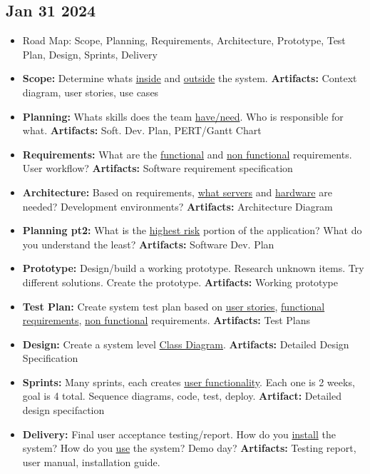 \documentclass[12pt]{article}
\begin{document}
\subsection*{Jan 31 2024}

\begin{itemize}
		  \item Road Map: Scope, Planning, Requirements, Architecture, Prototype, Test Plan, Design, Sprints, Delivery
		  \item \textbf{Scope:} Determine whats \underline{inside} and \underline{outside} the system. 
					 \textbf{Artifacts:} Context diagram, user stories, use cases
		  \item \textbf{Planning:} Whats skills does the team \underline{have/need}. Who is responsible for what. 
					 \textbf{Artifacts:} Soft. Dev. Plan, PERT/Gantt Chart
		  \item \textbf{Requirements:} What are the \underline{functional} and \underline{non functional} 
					 requirements. User workflow? \textbf{Artifacts:} Software requirement specification
		  \item \textbf{Architecture:} Based on requirements, \underline{what servers} and \underline{hardware} are needed? 
					 Development environments? \textbf{Artifacts:} Architecture Diagram
		  \item \textbf{Planning pt2:} What is the \underline{highest risk} portion of the application? What do you understand
					 the least? \textbf{Artifacts:} Software Dev. Plan
		  \item \textbf{Prototype:} Design/build a working prototype. Research unknown items. Try different solutions. 
					 Create the prototype. \textbf{Artifacts:} Working prototype
		  \item \textbf{Test Plan:} Create system test plan based on \underline{user stories},
					 \underline{functional requirements}, \underline{non functional}
					 requirements. \textbf{Artifacts:} Test Plans
		  \item \textbf{Design:} Create a system level \underline{Class Diagram}. \textbf{Artifacts:} 
					 Detailed Design Specification
		  \item \textbf{Sprints:} Many sprints, each creates \underline{user functionality}. Each one is 2 weeks, goal is 4 total.
					 Sequence diagrams, code, test, deploy. \textbf{Artifact:} Detailed design specifaction
		  \item \textbf{Delivery:} Final user acceptance testing/report. How do you \underline{install} the system?
					 How do you \underline{use} the system? Demo day? \textbf{Artifacts:} Testing report, user manual, installation
					 guide.
\end{itemize}
\end{document}

